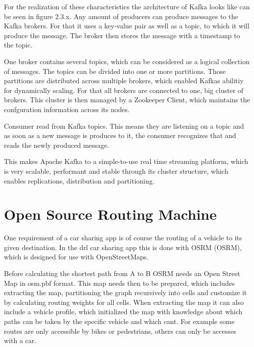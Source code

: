 
For the realization of these characteristics the architecture of Kafka looks like can be seen in figure 2.3.x. Any amount of producers can produce messages to the Kafka brokers. For that it uses a key-value pair as well as a topic, to which it will produce the message. The broker then stores the message with a timestamp to the topic. 


One broker contains several topics, which can be considered as a logical collection of messages. The topics can be divided into one or more partitions. Those partitions are distributed across multiple brokers, which enabled Kafkas abilitiy for dynamically scaling. For that all brokers are connected to one, big cluster of brokers. This cluster is then managed by a Zookeeper Client, which maintains the confguration information across its nodes.


Consumer read from Kafka topics. This means they are listening on a topic and as soon as a new message is produces to it, the consumer recognizes that and reads the newly produced message.

This makes Apache Kafka to a simple-to-use real time streaming platform, which is very scalable, performant and stable through its cluster structure, which enables replications, distribution and partitioning.


\section{Open Source Routing Machine}

One requirement of a car sharing app is of course the routing of a vehicle to its given destination. In the drl car sharing app this is done with \acs{OSRM} (\acl{OSRM}), which is designed for use with OpenStreetMaps.

Before calculating the shortest path from A to B OSRM needs an Open Street Map in osm.pbf format. This map needs then to be prepared, which includes extracting the map, partitioning the graph recursively into cells and customize it by calculating routing weights for all cells. When extracting the map it can also include a vehicle profile, which initialized the map with knowledge about which paths can be taken by the specific vehicle and which cant. For example some routes are only accessible by bikes or pedestrians, others can only be accesses with a car.

